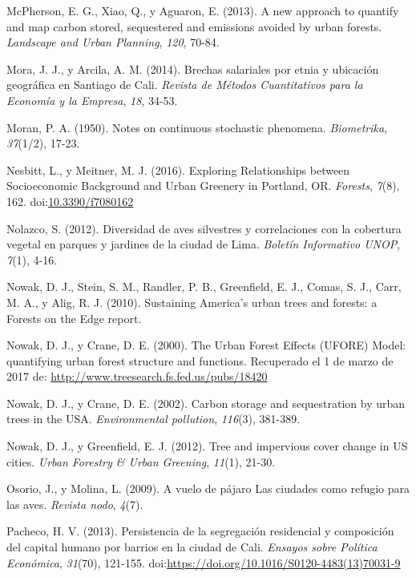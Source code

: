\documentclass[12pt,a4paper,oneside, openany]{book}
\theoremstyle{definition}
\theoremstyle{definition}
\theoremstyle{definition}
\theoremstyle{remark}
\begin{document}
\hypertarget{ref-mcpherson2013new}{}
McPherson, E. G., Xiao, Q., y Aguaron, E. (2013). A new approach to
quantify and map carbon stored, sequestered and emissions avoided by
urban forests. \emph{Landscape and Urban Planning}, \emph{120}, 70-84.

\hypertarget{ref-mora_brechas_2014}{}
Mora, J. J., y Arcila, A. M. (2014). Brechas salariales por etnia y
ubicación geográfica en Santiago de Cali. \emph{Revista de Métodos
Cuantitativos para la Economía y la Empresa}, \emph{18}, 34-53.

\hypertarget{ref-moran1950notes}{}
Moran, P. A. (1950). Notes on continuous stochastic phenomena.
\emph{Biometrika}, \emph{37}(1/2), 17-23.

\hypertarget{ref-nesbitt_exploring_2016}{}
Nesbitt, L., y Meitner, M. J. (2016). Exploring Relationships between
Socioeconomic Background and Urban Greenery in Portland, OR.
\emph{Forests}, \emph{7}(8), 162.
doi:\href{https://doi.org/10.3390/f7080162}{10.3390/f7080162}

\hypertarget{ref-nolazco_diversidad_2012}{}
Nolazco, S. (2012). Diversidad de aves silvestres y correlaciones con la
cobertura vegetal en parques y jardines de la ciudad de Lima.
\emph{Boletín Informativo UNOP}, \emph{7}(1), 4-16.

\hypertarget{ref-nowak_sustaining_2010}{}
Nowak, D. J., Stein, S. M., Randler, P. B., Greenfield, E. J., Comas, S.
J., Carr, M. A., y Alig, R. J. (2010). Sustaining America's urban trees
and forests: a Forests on the Edge report.

\hypertarget{ref-nowak_urban_2000}{}
Nowak, D. J., y Crane, D. E. (2000). The Urban Forest Effects (UFORE)
Model: quantifying urban forest structure and functions. Recuperado el 1
de marzo de 2017 de: \url{http://www.treesearch.fs.fed.us/pubs/18420}

\hypertarget{ref-nowak_carbon_2002}{}
Nowak, D. J., y Crane, D. E. (2002). Carbon storage and sequestration by
urban trees in the USA. \emph{Environmental pollution}, \emph{116}(3),
381-389.

\hypertarget{ref-nowak_tree_2012}{}
Nowak, D. J., y Greenfield, E. J. (2012). Tree and impervious cover
change in US cities. \emph{Urban Forestry \& Urban Greening},
\emph{11}(1), 21-30.

\hypertarget{ref-osorio_vuelo_2009}{}
Osorio, J., y Molina, L. (2009). A vuelo de pájaro Las ciudades como
refugio para las aves. \emph{Revista nodo}, \emph{4}(7).

\hypertarget{ref-PACHECO2013121}{}
Pacheco, H. V. (2013). Persistencia de la segregación residencial y
composición del capital humano por barrios en la ciudad de Cali.
\emph{Ensayos sobre Política Económica}, \emph{31}(70), 121-155.
doi:\href{https://doi.org/https://doi.org/10.1016/S0120-4483(13)70031-9}{https://doi.org/10.1016/S0120-4483(13)70031-9}
\end{document}
